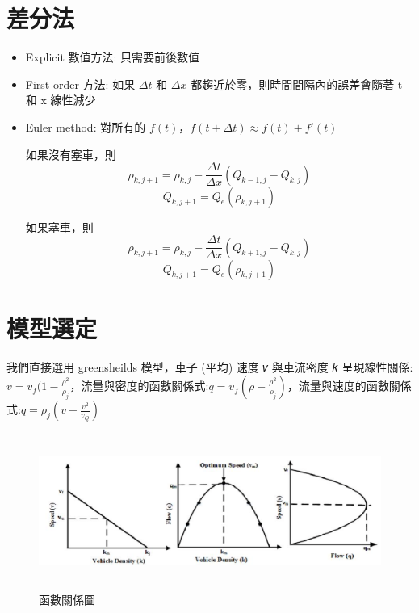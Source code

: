 \documentclass[a4paper, 11pt]{report}
\begin{document}
\newpage
\section{差分法}

\begin{itemize}
\item Explicit 數值方法: 只需要前後數值
\item First-order 方法: 如果 $\Delta t$ 和 $\Delta x$ 都趨近於零，則時間間隔內的誤差會隨著 t 和 x 線性減少
\item Euler method: 對所有的 $f(t)$，$f(t+\Delta t) \approx f(t) + f'(t)$

如果沒有塞車，則
\begin{equation*}
\rho_{k,j+1} = \rho_{k,j} - \frac{\Delta t}{\Delta x}(Q_{k-1,j} - Q_{k,j})
\end{equation*}
\begin{equation*}
Q_{k,j+1} = Q_e(\rho_{k,j+1})
\end{equation*}

如果塞車，則
\begin{equation*}
\rho_{k,j+1} = \rho_{k,j} - \frac{\Delta t}{\Delta x}(Q_{k+1,j} - Q_{k,j})
\end{equation*}
\begin{equation*}
Q_{k,j+1} = Q_e(\rho_{k,j+1})
\end{equation*}

\end{itemize}

\section{模型選定}

我們直接選用 greensheilds 模型，車子 (平均) 速度 𝑣 與車流密度 𝑘 呈現線性關係: $v = v_f (1- \frac{\rho^2}{\rho_j}$，流量與密度的函數關係式:$q = v_f(\rho-\frac{\rho^2}{\rho_j})$，流量與速度的函數關係式:$q = \rho_j(v-\frac{v^2}{v_Q})$
\begin{figure}[htbp]
\centerline{\includegraphics[height=2in]{function.png}}
\caption{函數關係圖}
\label{program_flowchart}
\end{figure}
\end{document}
